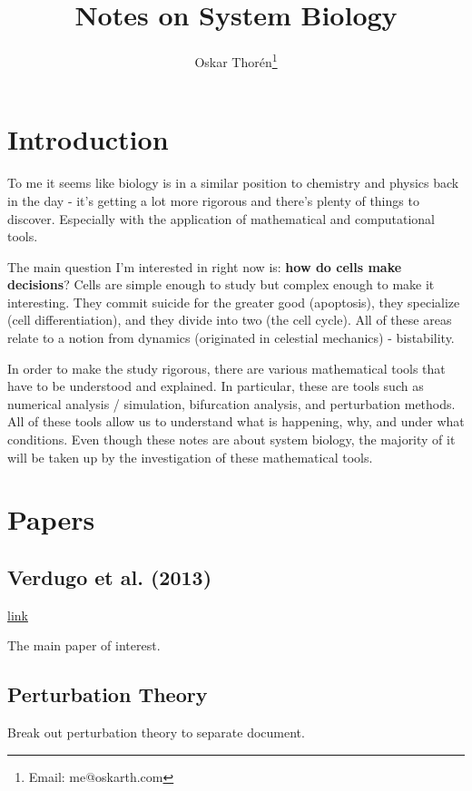 \documentclass[12pt]{report}
\newcommand{\link}[2]{\href{#1}{#2}}
\begin{document}
\title{Notes on System Biology}
\author{Oskar Thor{\'e}n\thanks{Email: me@oskarth.com}}

\maketitle

\chapter{Introduction}

To me it seems like biology is in a similar position to chemistry and
physics back in the day - it's getting a lot more rigorous and there's
plenty of things to discover. Especially with the application of
mathematical and computational tools.

The main question I'm interested in right now is: \textbf{how do cells
  make decisions}? Cells are simple enough to study but complex enough
to make it interesting. They commit suicide for the greater good
(apoptosis), they specialize (cell differentiation), and they divide
into two (the cell cycle). All of these areas relate to a notion from
dynamics (originated in celestial mechanics) - bistability.

In order to make the study rigorous, there are various mathematical
tools that have to be understood and explained. In particular, these
are tools such as numerical analysis / simulation, bifurcation
analysis, and perturbation methods. All of these tools allow us to
understand what is happening, why, and under what conditions. Even
though these notes are about system biology, the majority of it will
be taken up by the investigation of these mathematical tools.

\chapter{Papers}

\section{Verdugo et al. (2013)}

\link{http://rsob.royalsocietypublishing.org/content/royopenbio/3/3/120179.full.pdf}{link}

The main paper of interest.

\section{Perturbation Theory}

Break out perturbation theory to separate document.
\end{document}
